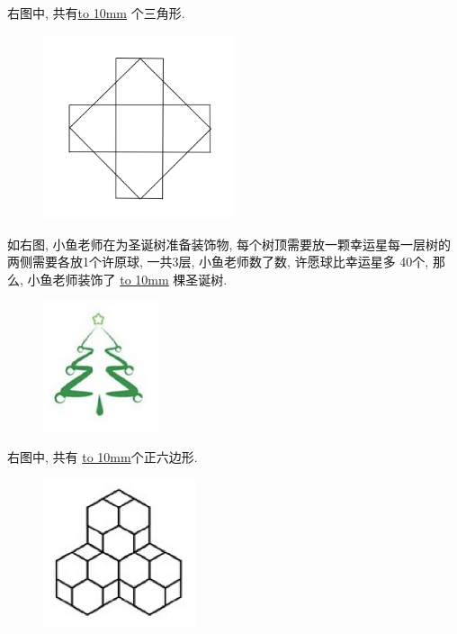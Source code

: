 \item {右图中, 共有\underline{\hbox to 10mm{}} 个三角形.
    \begin{figure}[H] 
        \centering
        \includegraphics[width=0.5\textwidth]{./pics/Chapter_6/12.png}
    \end{figure}
}

\item {如右图, 小鱼老师在为圣诞树准备装饰物, 每个树顶需要放一颗幸运星每一层树的两侧需要各放1个许原球, 一共3层, 小鱼老师数了数, 许愿球比幸运星多 40个, 那么, 小鱼老师装饰了 \underline{\hbox to 10mm{}} 棵圣诞树.
    \begin{figure}[H] 
        \centering
        \includegraphics[width=0.3\textwidth]{./pics/Chapter_6/13.png}
    \end{figure}
}

\item {
    右图中, 共有 \underline{\hbox to 10mm{}}个正六边形.
    \begin{figure}[H] 
        \centering
        \includegraphics[width=0.4\textwidth]{./pics/Chapter_6/14.png}
    \end{figure}
}

